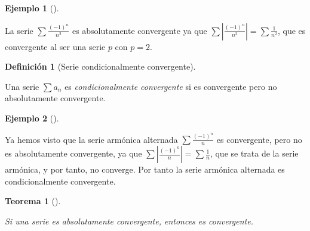 \documentclass[
  a4paper,
]{scrreport}
\theoremstyle{plain}
\theoremstyle{plain}
\theoremstyle{definition}
\newtheorem{definition}{Definición}[chapter]
\theoremstyle{definition}
\newtheorem{example}{Ejemplo}[chapter]
\theoremstyle{plain}
\newtheorem{theorem}{Teorema}[chapter]
\theoremstyle{remark}
\begin{document}
\leavevmode{}%
\begin{example}[]\label{exm-serie-absolutamente-convergente}

La serie \(\sum \frac{(-1)^n}{n^2}\) es absolutamente convergente ya que
\(\sum \left|\frac{(-1)^n}{n^2}\right|=\sum \frac{1}{n^2}\), que es
convergente al ser una serie \(p\) con \(p=2\).

\end{example}

\leavevmode{}%
\begin{definition}[Serie condicionalmente
convergente]\label{def-serie-condicionalmente-convergente}

Una serie \(\sum a_n\) es \emph{condicionalmente convergente} si es
convergente pero no absolutamente convergente.

\end{definition}

\leavevmode{}%
\begin{example}[]\label{exm-serie-condicionalmente-convergente}

Ya hemos visto que la serie armónica alternada \(\sum \frac{(-1)^n}{n}\)
es convergente, pero no es absolutamente convergente, ya que
\(\sum \left|\frac{(-1)^n}{n}\right|=\sum \frac{1}{n}\), que se trata de
la serie armónica, y por tanto, no converge. Por tanto la serie armónica
alternada es condicionalmente convergente.

\end{example}

\leavevmode{}%
\begin{theorem}[]\label{thm-condicion-convergencia-absoluta}

Si una serie es absolutamente convergente, entonces es convergente.

\end{theorem}
\end{document}
